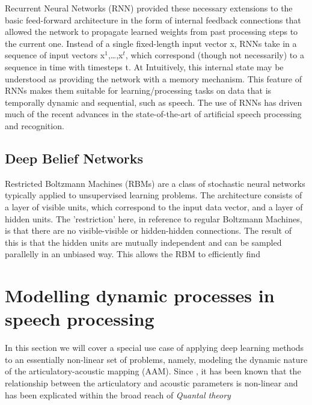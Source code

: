 \documentclass{article}[12pt]
\begin{document}
Recurrent Neural Networks (RNN) \cite{rumelhart1986} provided these necessary extensions to the basic feed-forward architecture in the form of internal feedback connections that allowed the network to propagate learned weights from past processing steps to the current one. Instead of a single fixed-length input vector x, RNNs take in a sequence of input vectors x$^1$,\ldots,x$^t$, which correspond (though not necessarily) to a sequence in time with timesteps t. At Intuitively, this internal state may be understood as providing the network with a memory mechanism. This feature of RNNs makes them suitable for learning/processing tasks on data that is temporally dynamic and sequential, such as speech. The use of RNNs has driven much of the recent advances in the state-of-the-art of artificial speech processing and recognition.

\subsection{Deep Belief Networks}
Restricted Boltzmann Machines (RBMs) are a class of stochastic neural networks typically applied to unsupervised learning problems. The architecture consists of a layer of visible units, which correspond to the input data vector, and a layer of hidden units. The 'restriction' here, in reference to regular Boltzmann Machines, is that there are no visible-visible or hidden-hidden connections. The result of this is that the hidden units are mutually independent and can be sampled parallelly in an unbiased way. This allows the RBM to efficiently find


\section{Modelling dynamic processes in speech processing}\label{section 4}
In this section we will cover a special use case of applying deep learning methods to an essentially non-linear set of problems, namely, modeling the dynamic nature of the articulatory-acoustic mapping (AAM). Since \cite{stevens1968}, it has been known that the relationship between the articulatory and acoustic parameters is non-linear and has been explicated within the broad reach of \emph{Quantal theory} \citep{stevens1968}
\end{document}
